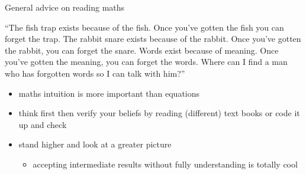 \documentclass{scrartcl}
\def\tightlist{}
\begin{document}
\begin{frame}{General advice on reading maths}
\protect\hypertarget{general-advice-on-reading-maths}{}

\begin{tcolorbox}[colback=red!5!white]
  {\large ``The fish trap exists because of the fish. Once you've gotten the fish you can forget the trap. The rabbit snare exists because of the rabbit. Once you've gotten the rabbit, you can forget the snare. Words exist because of meaning. Once you've gotten the meaning, you can forget the words. Where can I find a man who has forgotten words so I can talk with him?''}
  \hspace*{}
\end{tcolorbox}

\begin{itemize}
\tightlist
\item
  maths intuition is more important than equations
\end{itemize}

\bigskip

\begin{itemize}
\tightlist
\item
  think first then verify your beliefs by reading (different) text books
  or code it up and check
\end{itemize}

\bigskip

\begin{itemize}
\tightlist
\item
  stand higher and look at a greater picture

  \begin{itemize}
  \tightlist
  \item
    accepting intermediate results without fully understanding is
    totally cool
  \end{itemize}
\end{itemize}

\end{frame}
\end{document}
